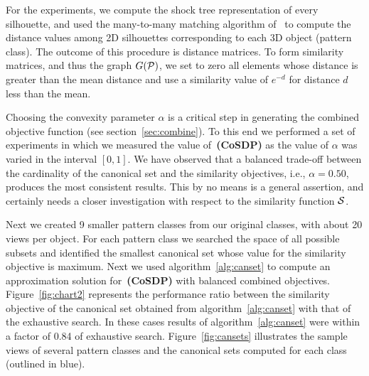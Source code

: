 \documentclass{ieee}
\def\P{{\cal P}}
\def\S{{\cal S}}
\begin{document}
For the experiments, we compute the shock tree representation of every
silhouette, and used the many-to-many matching algorithm
of~\cite{shokou_cvpr_2003} to compute the distance values among 2D
silhouettes corresponding to each 3D object (pattern class).  The
outcome of this procedure is distance matrices. To form similarity
matrices, and thus the graph $G(\P)$, we set to zero all elements
whose distance is greater than the mean distance and use a similarity
value of $e^{-d}$ for distance $d$ less than the mean.

Choosing the convexity parameter $\alpha$ is a critical step in
generating the combined objective function (see
section~\ref{sec:combine}). To this end we performed a set of
experiments in which we measured the value of~\textbf{(CoSDP)} as the
value of $\alpha$ was varied in the interval $[0,1]$. We have observed
that a balanced trade-off between the cardinality of the canonical set and the
similarity objectives, i.e., $\alpha=0.50$, produces the most consistent
results.
%
%
This by no means is a general
assertion, and  certainly needs a closer investigation with respect
to the similarity function $\S$. 

 
Next we created 9 smaller pattern classes from our original classes,
with about 20 views per object. For each pattern class we searched the
space of all possible subsets and identified the smallest canonical
set whose value for the similarity objective is maximum. Next we used
algorithm~\ref{alg:canset} to compute an approximation solution
for~\textbf{(CoSDP)} with balanced combined objectives.
Figure~\ref{fig:chart2} represents the performance ratio between the
similarity objective of the canonical set obtained from
algorithm~\ref{alg:canset} with that of the exhaustive search. In
these cases results of algorithm~\ref{alg:canset} were within a factor
of 0.84 of exhaustive search. Figure~\ref{fig:cansets} illustrates the
sample views of several pattern classes and the canonical sets
computed for each class (outlined in blue).
\end{document}
